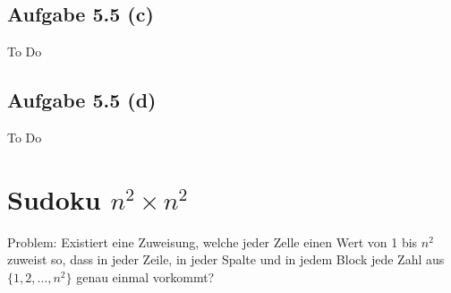 \documentclass[12pt,a4paper]{article}
\begin{document}
\subsection*{Aufgabe 5.5 (c)}
To Do

\subsection*{Aufgabe 5.5 (d)}
To Do

\section*{Sudoku $n^2\times n^2$}
Problem: Existiert eine Zuweisung, welche jeder Zelle einen Wert von 1 bis $n^2$ zuweist so, dass in jeder Zeile, in jeder  Spalte und in jedem Block jede Zahl aus $\lbrace1,2,\ldots,n^2\rbrace$ genau einmal vorkommt?
\end{document}
